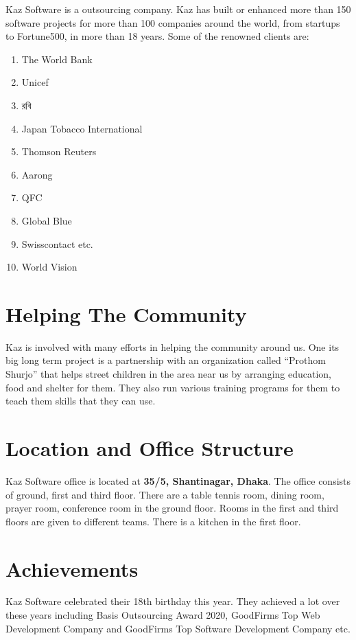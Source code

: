 Kaz Software is a outsourcing company.
Kaz has built or enhanced more than 150 software projects for more than 100 companies around the world, from startups to Fortune500, in more than 18 years.
Some of the renowned clients are:

\begin{enumerate}
    \item The World Bank 
    \item Unicef
    \item \textbengali{রবি}
    \item Japan Tobacco International
    \item Thomson Reuters
    \item Aarong
    \item QFC
    \item Global Blue
    \item Swisscontact etc.
    \item World Vision
\end{enumerate}

\section{Helping The Community}

Kaz is involved with many efforts in helping the community around us.
One its big long term project is a partnership with an organization called “Prothom Shurjo” that helps street children in the area near us by arranging education, food and shelter for them.
They also run various training programs for them to teach them skills that they can use.

\section{Location and Office Structure}

Kaz Software office is located at \textbf{35/5, Shantinagar, Dhaka}.
The office consists of ground, first and third floor.
There are a table tennis room, dining room, prayer room, conference room in the ground floor.
Rooms in the first and third floors are given to different teams.
There is a kitchen in the first floor.

\section{Achievements}

Kaz Software celebrated their 18th birthday this year.
They achieved a lot over these years including Basis Outsourcing Award 2020, GoodFirms Top Web Development Company and GoodFirms Top Software Development Company etc.